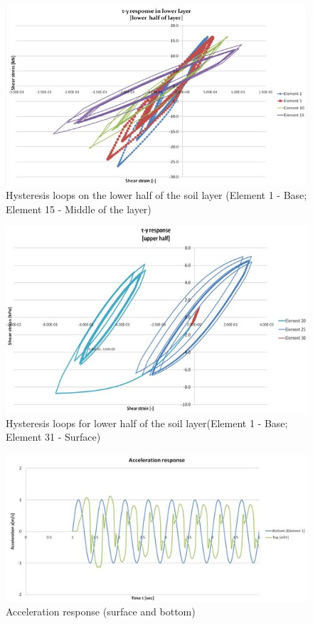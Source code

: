 	\begin{figure}[h!]
		\centering
		\includegraphics[width=0.7\linewidth]{"response1"}
		\caption[]{Hysteresis loops on the lower half of the soil layer (Element 1 - Base; Element 15 - Middle of the layer)}
		\label{response1}
	\end{figure}
	
	\begin{figure}[h!]
		\centering
		\includegraphics[width=0.7\linewidth]{"response2"}
		\caption[]{Hysteresis loops for lower half of the soil layer(Element 1 - Base; Element 31 - Surface)}
		\label{response2}
	\end{figure}
	
	\begin{figure}[h!]
		\centering
		\includegraphics[width=0.7\linewidth]{"acc_response1"}
		\caption{Acceleration response (surface and bottom)}
		\label{acc1}
	\end{figure}
	
